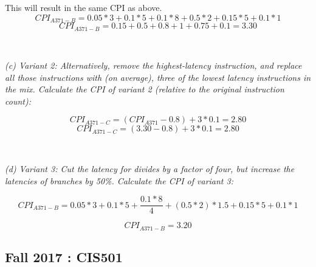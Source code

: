 \documentclass[12pt]{article}
\newenvironment{QandA}{\begin{enumerate}[label=\bfseries\alph*.]\bfseries}
                      {\end{enumerate}}
\newenvironment{answered}{\par\quad\normalfont}{}
\begin{document}
\begin{QandA}
\begin{answered}
    This will result in the same CPI as above.
    \begin{equation*}
        CPI_{A371-B} = 0.05 * 3 + 0.1 * 5 + 0.1 * 8 + 0.5 * 2 + 0.15 * 5 + 0.1 * 1
    \end{equation*}
    \begin{equation*}
        CPI_{A371-B} = 0.15 + 0.5 + 0.8 + 1 + 0.75 + 0.1 = 3.30
    \end{equation*}
    
    \ 
    
    \textit{(c) Variant 2: Alternatively, remove the highest-latency instruction, and replace all those instructions with (on average), three of the lowest latency instructions in the mix. Calculate the CPI of variant 2 (relative to the original instruction count):}
    
    \begin{equation*}
        CPI_{A371-C} = (CPI_{A371} - 0.8) + 3 * 0.1 = 2.80
    \end{equation*}
    \begin{equation*}
        CPI_{A371-C} = (3.30 - 0.8) + 3 * 0.1 = 2.80
    \end{equation*}
    
    \ 
    
    \textit{(d) Variant 3: Cut the latency for divides by a factor of four, but increase the latencies of branches by 50\%. Calculate the CPI of variant 3:}
    
    \begin{equation*}
        CPI_{A371-B} = 0.05 * 3 + 0.1 * 5 + \frac{0.1 * 8}{4} + (0.5 * 2)*1.5 + 0.15 * 5 + 0.1 * 1
    \end{equation*}
    
    \begin{equation*}
        CPI_{A371-B} = 3.20
    \end{equation*}
    
    \end{answered}

\end{QandA}

\subsection{Fall 2017 : CIS501}
\end{document}
